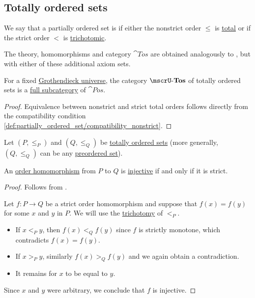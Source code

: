 \subsection{Totally ordered sets}\label{subsec:totally_ordered_sets}

\begin{definition}\label{def:totally_ordered_set}
  We say that a partially ordered set is  if either the nonstrict order \( \leq \) is \hyperref[def:binary_relation/total]{total} or if the strict order \( < \) is \hyperref[def:binary_relation/trichotomic]{trichotomic}.

  The theory, homomorphisms and category \( \cat{Tos} \) are obtained analogously to , but with either of these additional axiom sets.

  For a fixed \hyperref[def:grothendieck_universe]{Grothendieck universe}, the category \( \ucat{Tos} \) of totally ordered sets is a \hyperref[def:subcategory]{full subcategory} of \hyperref[def:partially_ordered_set/category]{\( \cat{Pos} \)}.
\end{definition}
\begin{proof}
  Equivalence between nonstrict and strict total orders follows directly from the compatibility condition \eqref{def:partially_ordered_set/compatibility_nonstrict}.
\end{proof}

\begin{proposition}\label{thm:total_order_embedding_iff_strict}
  Let \( (P, \leq_P) \) and \( (Q, \leq_Q) \) be \hyperref[def:totally_ordered_set]{totally ordered sets} (more generally, \( (Q, \leq_Q) \) can be any \hyperref[def:preordered_set]{preordered set}).

  An \hyperref[def:partially_ordered_set/homomorphism]{order homomorphism} from \( P \) to \( Q \) is \hyperref[def:function_invertibility/injective]{injective} if and only if it is strict.
\end{proposition}
\begin{proof}
  \SufficiencySubProof Follows from .

  \NecessitySubProof Let \( f: P \to Q \) be a strict order homomorphism and suppose that \( f(x) = f(y) \) for some \( x \) and \( y \) in \( P \). We will use the \hyperref[def:binary_relation/trichotomic]{trichotomy} of \( <_P \).
  \begin{itemize}
    \item If \( x <_P y \), then \( f(x) <_Q f(y) \) since \( f \) is strictly monotone, which contradicts \( f(x) = f(y) \).

    \item If \( x >_P y \), similarly \( f(x) >_Q f(y) \) and we again obtain a contradiction.

    \item It remains for \( x \) to be equal to \( y \).
  \end{itemize}

  Since \( x \) and \( y \) were arbitrary, we conclude that \( f \) is injective.
\end{proof}

